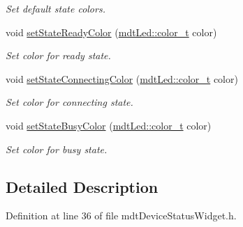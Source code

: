 \begin{DoxyCompactItemize}
\begin{DoxyCompactList}\small\item\em Set default state colors. \end{DoxyCompactList}\item 
\hypertarget{classmdt_device_status_widget_a0e8d845302a6c73a045e1392b5a549dd}{
void \hyperlink{classmdt_device_status_widget_a0e8d845302a6c73a045e1392b5a549dd}{setStateReadyColor} (\hyperlink{classmdt_led_a2d57d9ef04d2105d2fad93b57fc7cfef}{mdtLed::color\_\-t} color)}
\label{classmdt_device_status_widget_a0e8d845302a6c73a045e1392b5a549dd}

\begin{DoxyCompactList}\small\item\em Set color for ready state. \end{DoxyCompactList}\item 
\hypertarget{classmdt_device_status_widget_ad240144a1c2da47a3f826c1987343ab7}{
void \hyperlink{classmdt_device_status_widget_ad240144a1c2da47a3f826c1987343ab7}{setStateConnectingColor} (\hyperlink{classmdt_led_a2d57d9ef04d2105d2fad93b57fc7cfef}{mdtLed::color\_\-t} color)}
\label{classmdt_device_status_widget_ad240144a1c2da47a3f826c1987343ab7}

\begin{DoxyCompactList}\small\item\em Set color for connecting state. \end{DoxyCompactList}\item 
\hypertarget{classmdt_device_status_widget_ae9f7ab642d15591f0207835f2d3de9e3}{
void \hyperlink{classmdt_device_status_widget_ae9f7ab642d15591f0207835f2d3de9e3}{setStateBusyColor} (\hyperlink{classmdt_led_a2d57d9ef04d2105d2fad93b57fc7cfef}{mdtLed::color\_\-t} color)}
\label{classmdt_device_status_widget_ae9f7ab642d15591f0207835f2d3de9e3}

\begin{DoxyCompactList}\small\item\em Set color for busy state. \end{DoxyCompactList}\end{DoxyCompactItemize}


\subsection{Detailed Description}


Definition at line 36 of file mdtDeviceStatusWidget.h.



